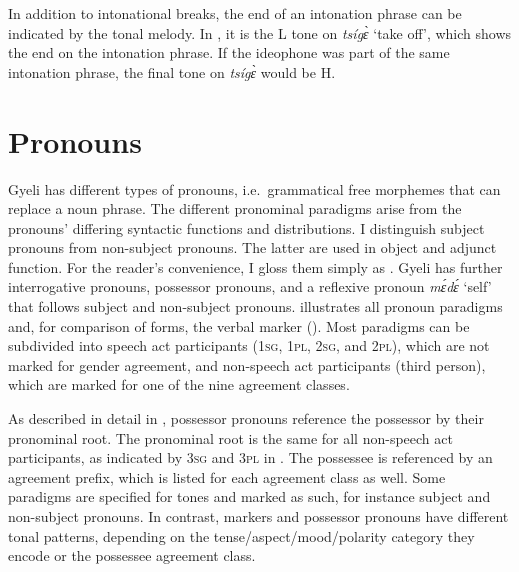 \noindent In addition to intonational breaks, the end of an intonation phrase can be indicated by the tonal melody. In , it is the L tone on {\itshape tsígɛ̀} `take off', which shows the end on the intonation phrase. If the ideophone was part of the same intonation phrase, the final tone on {\itshape tsígɛ̀} would be H.


\section{Pronouns}
\label{sec:PRO}

Gyeli has different types of pronouns, i.e.\ grammatical free morphemes that can replace a noun phrase. The different pronominal paradigms arise from the pronouns' differing syntactic functions and distributions. I distinguish subject pronouns from non-subject pronouns. The latter are used in object and adjunct function. For the reader's convenience, I gloss them simply as {\OBJ}.  Gyeli has further interrogative pronouns, possessor pronouns, and a reflexive pronoun {\itshape mɛ́dɛ́} `self' that follows subject and non-subject pronouns.  illustrates all pronoun paradigms and, for comparison of forms, the verbal {\STAMP} marker (). Most paradigms can be subdivided into speech act participants (1\textsc{sg}, 1\textsc{pl}, 2\textsc{sg}, and 2\textsc{pl}), which are not marked for gender agreement, and non-speech act participants (third person), which are marked for one of the nine agreement classes.  

As described in detail in , possessor pronouns reference the possessor by their pronominal root. The pronominal root is the same for all non-speech act participants, as indicated by 3\textsc{sg} and 3\textsc{pl} in . The possessee is referenced by an agreement prefix, which is listed for each agreement class as well. 
Some paradigms are specified for tones and marked as such, for instance subject and non-subject pronouns. In contrast, {\STAMP} markers and possessor pronouns have different tonal patterns, depending on the tense/aspect/mood/polarity category they encode or the possessee agreement class. 

